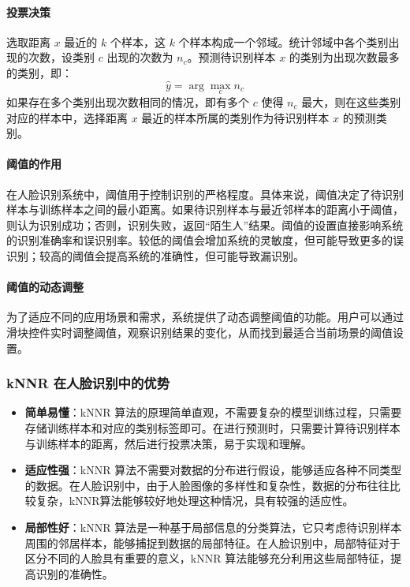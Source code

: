 \documentclass{article}
\begin{document}
\paragraph{投票决策}
选取距离 $x$ 最近的 $k$ 个样本，这 $k$ 个样本构成一个邻域。统计邻域中各个类别出现的次数，设类别 $c$ 出现的次数为 $n_{c}$。预测待识别样本 $x$ 的类别为出现次数最多的类别，即：
\[
\hat{y}=\arg\max_{c}n_{c}
\]
如果存在多个类别出现次数相同的情况，即有多个 $c$ 使得 $n_{c}$ 最大，则在这些类别对应的样本中，选择距离 $x$ 最近的样本所属的类别作为待识别样本 $x$ 的预测类别。

\paragraph{阈值的作用}
在人脸识别系统中，阈值用于控制识别的严格程度。具体来说，阈值决定了待识别样本与训练样本之间的最小距离。如果待识别样本与最近邻样本的距离小于阈值，则认为识别成功；否则，识别失败，返回“陌生人”结果。阈值的设置直接影响系统的识别准确率和误识别率。较低的阈值会增加系统的灵敏度，但可能导致更多的误识别；较高的阈值会提高系统的准确性，但可能导致漏识别。

\paragraph{阈值的动态调整}
为了适应不同的应用场景和需求，系统提供了动态调整阈值的功能。用户可以通过滑块控件实时调整阈值，观察识别结果的变化，从而找到最适合当前场景的阈值设置。

\subsubsection{kNNR 在人脸识别中的优势}
\begin{itemize}
    \item \textbf{简单易懂}：kNNR 算法的原理简单直观，不需要复杂的模型训练过程，只需要存储训练样本和对应的类别标签即可。在进行预测时，只需要计算待识别样本与训练样本的距离，然后进行投票决策，易于实现和理解。
    \item \textbf{适应性强}：kNNR 算法不需要对数据的分布进行假设，能够适应各种不同类型的数据。在人脸识别中，由于人脸图像的多样性和复杂性，数据的分布往往比较复杂，kNNR算法能够较好地处理这种情况，具有较强的适应性。
    \item \textbf{局部性好}：kNNR 算法是一种基于局部信息的分类算法，它只考虑待识别样本周围的邻居样本，能够捕捉到数据的局部特征。在人脸识别中，局部特征对于区分不同的人脸具有重要的意义，kNNR 算法能够充分利用这些局部特征，提高识别的准确性。
\end{itemize}
\newpage
\end{document}
